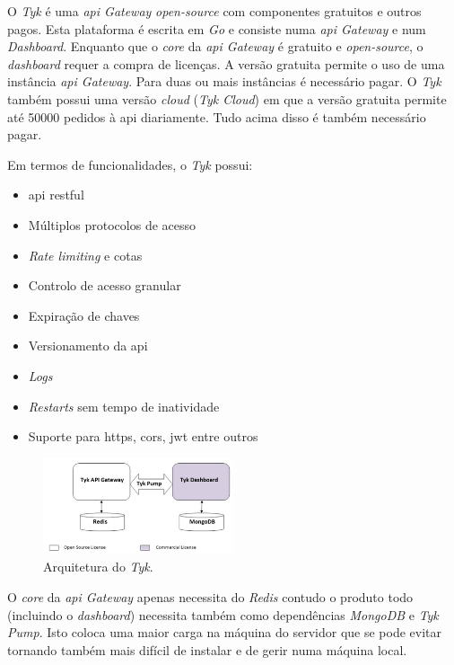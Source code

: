 O \textit{Tyk} é uma \textit{\acrshort{api} Gateway} \textit{open-source} com componentes gratuitos e outros pagos. Esta plataforma é escrita em \textit{Go} e consiste numa \textit{\acrshort{api} Gateway} e num \textit{Dashboard}. Enquanto que o \textit{core} da \textit{\acrshort{api} Gateway} é gratuito e \textit{open-source}, o \textit{dashboard} requer a compra de licenças. A versão gratuita permite o uso de uma instância \textit{\acrshort{api} Gateway}. Para duas ou mais instâncias é necessário pagar. O \textit{Tyk} também possui uma versão \textit{cloud} (\textit{Tyk Cloud}) em que a versão gratuita permite até 50000 pedidos à \acrshort{api} diariamente. Tudo acima disso é também necessário pagar.

Em termos de funcionalidades, o \textit{Tyk} possui:~\cite{tyk}
\begin{itemize}
    \item \acrshort{api} \acrshort{rest}ful
    \item Múltiplos protocolos de acesso
    \item \textit{Rate limiting} e cotas
    \item Controlo de acesso granular
    \item Expiração de chaves
    \item Versionamento da \acrshort{api}
    \item \textit{Logs}
    \item \textit{Restarts} sem tempo de inatividade
    \item Suporte para \acrshort{https}, \acrshort{cors}, \acrshort{jwt} entre outros
\end{itemize}

\begin{figure}[H]
    \begin{center}
        \includegraphics[width=0.5\textwidth]{img/tykArch.png}
    \end{center}
    \caption{Arquitetura do \textit{Tyk}.~\cite{tyk}}
\end{figure}

O \textit{core} da \textit{\acrshort{api} Gateway} apenas necessita do \textit{Redis} contudo o produto todo (incluindo o \textit{dashboard}) necessita também como dependências \textit{MongoDB} e \textit{Tyk Pump}. Isto coloca uma maior carga na máquina do servidor que se pode evitar tornando também mais difícil de instalar e de gerir numa máquina local.

